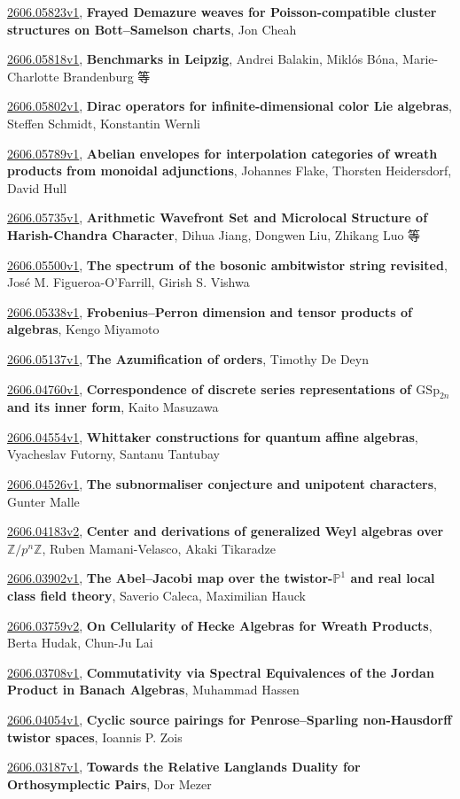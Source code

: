 \documentclass[9pt, a4paper]{article}
\theoremstyle{plain}
\theoremstyle{definition}
\theoremstyle{remark}
\newcommand{\arxiv}[3]{\href{https://arxiv.org/abs/#1}{#1}, \textbf{\textcolor{arxivblue}{#2}}, #3}
\begin{document}
\arxiv{2606.05823v1}{Frayed Demazure weaves for Poisson-compatible cluster structures on Bott--Samelson charts}{Jon Cheah}

\arxiv{2606.05818v1}{Benchmarks in Leipzig}{Andrei Balakin, Miklós Bóna, Marie-Charlotte Brandenburg 等}

\arxiv{2606.05802v1}{Dirac operators for infinite-dimensional color Lie algebras}{Steffen Schmidt, Konstantin Wernli}

\arxiv{2606.05789v1}{Abelian envelopes for interpolation categories of wreath products from monoidal adjunctions}{Johannes Flake, Thorsten Heidersdorf, David Hull}

\arxiv{2606.05735v1}{Arithmetic Wavefront Set and Microlocal Structure of Harish-Chandra Character}{Dihua Jiang, Dongwen Liu, Zhikang Luo 等}

\arxiv{2606.05500v1}{The spectrum of the bosonic ambitwistor string revisited}{José M. Figueroa-O'Farrill, Girish S. Vishwa}

\arxiv{2606.05338v1}{Frobenius--Perron dimension and tensor products of algebras}{Kengo Miyamoto}

\arxiv{2606.05137v1}{The Azumification of orders}{Timothy De Deyn}

\arxiv{2606.04760v1}{Correspondence of discrete series representations of $\mathrm{GSp}_{2n}$ and its inner form}{Kaito Masuzawa}

\arxiv{2606.04554v1}{Whittaker constructions for quantum affine algebras}{Vyacheslav Futorny, Santanu Tantubay}

\arxiv{2606.04526v1}{The subnormaliser conjecture and unipotent characters}{Gunter Malle}

\arxiv{2606.04183v2}{Center and derivations of generalized Weyl algebras over $\mathbb{Z}/p^n\mathbb{Z}$}{Ruben Mamani-Velasco, Akaki Tikaradze}

\arxiv{2606.03902v1}{The Abel--Jacobi map over the twistor-$\mathbb{P}^1$ and real local class field theory}{Saverio Caleca, Maximilian Hauck}

\arxiv{2606.03759v2}{On Cellularity of Hecke Algebras for Wreath Products}{Berta Hudak, Chun-Ju Lai}

\arxiv{2606.03708v1}{Commutativity via Spectral Equivalences of the Jordan Product in Banach Algebras}{Muhammad Hassen}

\arxiv{2606.04054v1}{Cyclic source pairings for Penrose--Sparling non-Hausdorff twistor spaces}{Ioannis P. Zois}

\arxiv{2606.03187v1}{Towards the Relative Langlands Duality for Orthosymplectic Pairs}{Dor Mezer}
\end{document}
